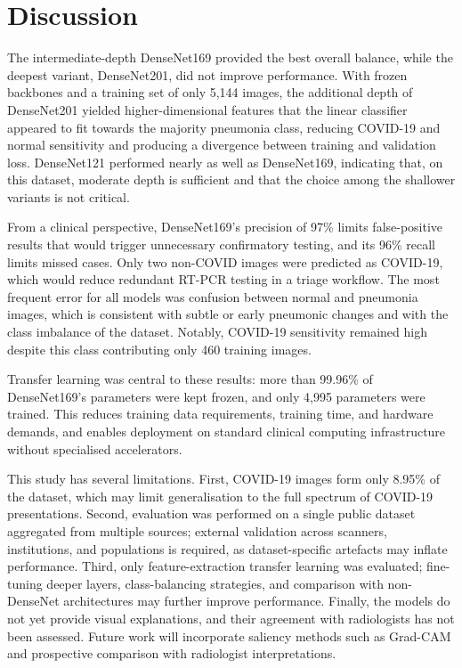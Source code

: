 \documentclass[pdflatex,sn-mathphys-num]{sn-jnl}%
\theoremstyle{thmstyleone}%
\theoremstyle{thmstyletwo}%
\theoremstyle{thmstylethree}%
\begin{document}
\section{Discussion}
\label{sec:discussion}

The intermediate-depth DenseNet169 provided the best overall balance, while the deepest variant, DenseNet201, did not improve performance. With frozen backbones and a training set of only 5,144 images, the additional depth of DenseNet201 yielded higher-dimensional features that the linear classifier appeared to fit towards the majority pneumonia class, reducing COVID-19 and normal sensitivity and producing a divergence between training and validation loss. DenseNet121 performed nearly as well as DenseNet169, indicating that, on this dataset, moderate depth is sufficient and that the choice among the shallower variants is not critical.

From a clinical perspective, DenseNet169's precision of 97\% limits false-positive results that would trigger unnecessary confirmatory testing, and its 96\% recall limits missed cases. Only two non-COVID images were predicted as COVID-19, which would reduce redundant RT-PCR testing in a triage workflow. The most frequent error for all models was confusion between normal and pneumonia images, which is consistent with subtle or early pneumonic changes and with the class imbalance of the dataset. Notably, COVID-19 sensitivity remained high despite this class contributing only 460 training images.

Transfer learning was central to these results: more than 99.96\% of DenseNet169's parameters were kept frozen, and only 4,995 parameters were trained. This reduces training data requirements, training time, and hardware demands, and enables deployment on standard clinical computing infrastructure without specialised accelerators.

This study has several limitations. First, COVID-19 images form only 8.95\% of the dataset, which may limit generalisation to the full spectrum of COVID-19 presentations. Second, evaluation was performed on a single public dataset aggregated from multiple sources; external validation across scanners, institutions, and populations is required, as dataset-specific artefacts may inflate performance. Third, only feature-extraction transfer learning was evaluated; fine-tuning deeper layers, class-balancing strategies, and comparison with non-DenseNet architectures may further improve performance. Finally, the models do not yet provide visual explanations, and their agreement with radiologists has not been assessed. Future work will incorporate saliency methods such as Grad-CAM and prospective comparison with radiologist interpretations.
\end{document}

